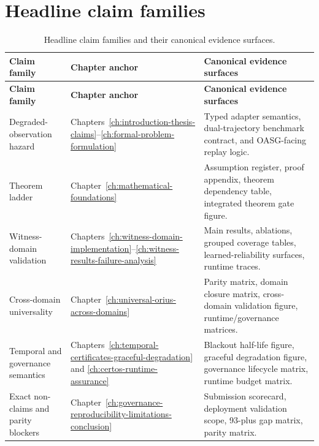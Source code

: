 \section{Headline claim families}
\begin{longtable}{p{}p{}p{}}
\caption{Headline claim families and their canonical evidence surfaces.}\label{tab:headline-claim-families}\\
\toprule
\textbf{Claim family} & \textbf{Chapter anchor} & \textbf{Canonical evidence surfaces}\\
\midrule
\endfirsthead
\toprule
\textbf{Claim family} & \textbf{Chapter anchor} & \textbf{Canonical evidence surfaces}\\
\midrule
\endhead
Degraded-observation hazard & Chapters~\ref{ch:introduction-thesis-claims}--\ref{ch:formal-problem-formulation} & Typed adapter semantics, dual-trajectory benchmark contract, and OASG-facing replay logic.\\
Theorem ladder & Chapter~\ref{ch:mathematical-foundations} & Assumption register, proof appendix, theorem dependency table, integrated theorem gate figure.\\
Witness-domain validation & Chapters~\ref{ch:witness-domain-implementation}--\ref{ch:witness-results-failure-analysis} & Main results, ablations, grouped coverage tables, learned-reliability surfaces, runtime traces.\\
Cross-domain universality & Chapter~\ref{ch:universal-orius-across-domains} & Parity matrix, domain closure matrix, cross-domain validation figure, runtime/governance matrices.\\
Temporal and governance semantics & Chapters~\ref{ch:temporal-certificates-graceful-degradation} and \ref{ch:certos-runtime-assurance} & Blackout half-life figure, graceful degradation figure, governance lifecycle matrix, runtime budget matrix.\\
Exact non-claims and parity blockers & Chapter~\ref{ch:governance-reproducibility-limitations-conclusion} & Submission scorecard, deployment validation scope, 93-plus gap matrix, parity matrix.\\
\bottomrule
\end{longtable}

